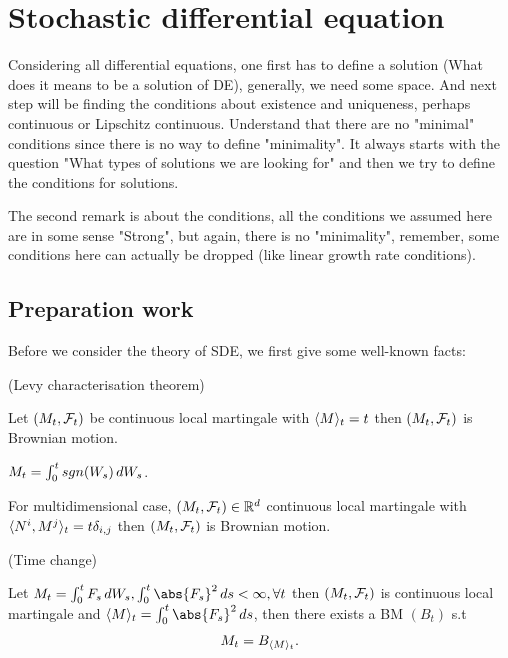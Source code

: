 \newpage 
\section{Stochastic differential equation}
\begin{rem}
Considering all differential equations, one first has to define a solution (What does it means to be a solution of DE), generally, we need some space. And next step will be finding the conditions about existence and uniqueness, perhaps continuous or Lipschitz continuous. Understand that there are no "minimal" conditions since there is no way to define "minimality". It always starts with the question "What types of solutions we are looking for" and then we try to define the conditions for solutions.

The second remark is about the conditions, all the conditions we assumed here are in some sense "Strong", but again, there is no "minimality", remember, some conditions here can actually be dropped (like linear growth rate conditions). 
\end{rem}

\subsection{Preparation work}
Before we consider the theory of SDE, we first give some well-known facts:

\begin{thm}{(Levy characterisation theorem)}

Let $(M_t, \mathcal{F}_t)$ be continuous local martingale with $\langle{M} \rangle_{t} = t$ then $(M_t, \mathcal{F}_t)$ is Brownian motion.
\end{thm}

\begin{example}
$M_t = \int_0^t sgn(W_s) \mathop{}\!d W_s$.
\end{example}
\begin{lem}
For multidimensional case, $(M_t, \mathcal{F}_t)\in \mathbb{R}^d$ continuous local martingale with $\langle{N^i, M^j} \rangle_{t} = t\delta_{i,j}$ then $(M_t, \mathcal{F}_t)$ is Brownian motion.
\end{lem}

\begin{thm}{(Time change)}\label{Thm: time_change}

Let $M_t = \int_0^t F_s \diff W_s, \int_0^t \abs{F_s}^2 \diff s < \infty, \forall t$ then $(M_t, \mathcal{F}_t) $ is continuous local martingale and $\qvar{M}{t} = \int_0^t \abs{F_s}^2 \diff s$, then there exists a BM $(B_t)$ s.t
\begin{equation*}
    M_t = B_{\langle{M} \rangle_{t}}.
\end{equation*}
\end{thm}


